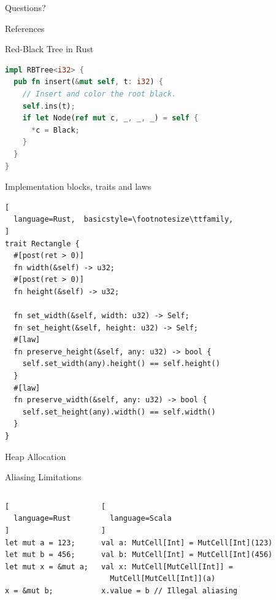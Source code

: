 \begin{frame}[standout]
Questions?
\end{frame}


\begin{frame}[allowframebreaks]{References}
  
  
\end{frame}


\appendix

\begin{frame}[fragile]{Red-Black Tree in Rust}
\begin{lstlisting}[language=Rust, caption={Insert method}]
impl RBTree<i32> {
  pub fn insert(&mut self, t: i32) {
    // Insert and color the root black.
    self.ins(t);
    if let Node(ref mut c, _, _, _) = self {
      *c = Black;
    }
  }
}
\end{lstlisting}
\end{frame}

\begin{frame}[fragile]{Implementation blocks, traits and laws}
\begin{lstlisting}[
  language=Rust,  basicstyle=\footnotesize\ttfamily,
]
trait Rectangle {
  #[post(ret > 0)]
  fn width(&self) -> u32;
  #[post(ret > 0)]
  fn height(&self) -> u32;

  fn set_width(&self, width: u32) -> Self;
  fn set_height(&self, height: u32) -> Self;
  #[law]
  fn preserve_height(&self, any: u32) -> bool {
    self.set_width(any).height() == self.height()
  }
  #[law]
  fn preserve_width(&self, any: u32) -> bool {
    self.set_height(any).width() == self.width()
  }
}
\end{lstlisting}
\end{frame}

\begin{frame}{Heap Allocation}

\end{frame}

\begin{frame}[fragile]{Aliasing Limitations}
\begin{columns}[T]
\begin{lstlisting}[
  language=Rust
]
let mut a = 123;
let mut b = 456;
let mut x = &mut a;

x = &mut b;
\end{lstlisting}

\begin{lstlisting}[
  language=Scala
]
val a: MutCell[Int] = MutCell[Int](123)
val b: MutCell[Int] = MutCell[Int](456)
val x: MutCell[MutCell[Int]] =
  MutCell[MutCell[Int]](a)
x.value = b // Illegal aliasing
\end{lstlisting}
\end{columns}
\end{frame}

